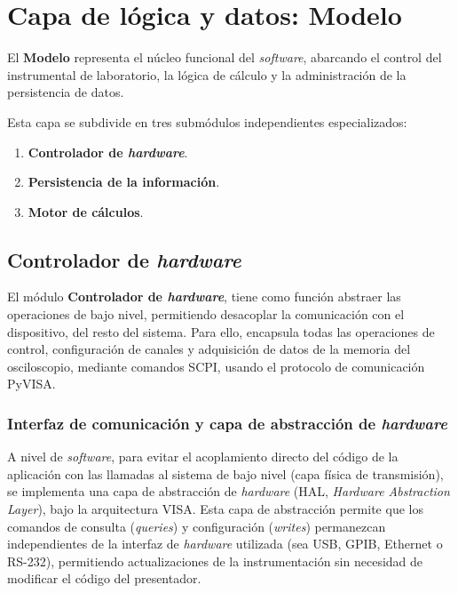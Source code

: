 \section{Capa de lógica y datos: Modelo}
\label{sec:capa_modelo}

El \textbf{Modelo} representa el núcleo funcional del \emph{software}, abarcando el control del instrumental de laboratorio, la lógica de cálculo y la administración de la persistencia de datos.

Esta capa se subdivide en tres submódulos independientes especializados:
\begin{enumerate}
    \item \textbf{Controlador de \emph{hardware}}.
    \item \textbf{Persistencia de la información}.
    \item \textbf{Motor de cálculos}.
\end{enumerate}

\subsection{Controlador de \emph{hardware}}
\label{subsec:controlador_osciloscopio}

El módulo \textbf{Controlador de \emph{hardware}}, tiene como función abstraer las operaciones de bajo nivel, permitiendo desacoplar la comunicación con el dispositivo, del resto del sistema. Para ello, encapsula todas las operaciones de control, configuración de canales y adquisición de datos de la memoria del osciloscopio, mediante comandos SCPI, usando el protocolo de comunicación PyVISA.

\subsubsection{Interfaz de comunicación y capa de abstracción de \emph{hardware}}
\label{subsubsec:interfaz_fisica_hal}

A nivel de \emph{software}, para evitar el acoplamiento directo del código de la aplicación con las llamadas al sistema de bajo nivel (capa física de transmisión), se implementa una capa de abstracción de \emph{hardware} (HAL, \emph{Hardware Abstraction Layer}), bajo la arquitectura VISA. Esta capa de abstracción permite que los comandos de consulta (\textit{queries}) y configuración (\textit{writes}) permanezcan independientes de la interfaz de \emph{hardware} utilizada (sea USB, GPIB, Ethernet o RS-232), permitiendo actualizaciones de la instrumentación sin necesidad de modificar el código del presentador.

